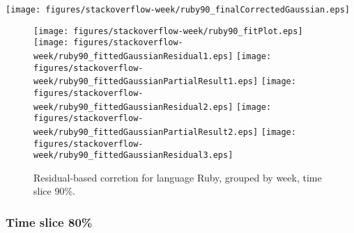 \begin{center}
{\texttt{[image: figures/stackoverflow-week/ruby90\_finalCorrectedGaussian.eps]}}
\end{center}

\FloatBarrier

\begin{figure}[t]
\centering
{}
{\texttt{[image: figures/stackoverflow-week/ruby90\_fitPlot.eps]}}
{\texttt{[image: figures/stackoverflow-week/ruby90\_fittedGaussianResidual1.eps]}}
{\texttt{[image: figures/stackoverflow-week/ruby90\_fittedGaussianPartialResult1.eps]}}
{\texttt{[image: figures/stackoverflow-week/ruby90\_fittedGaussianResidual2.eps]}}
{\texttt{[image: figures/stackoverflow-week/ruby90\_fittedGaussianPartialResult2.eps]}}
{\texttt{[image: figures/stackoverflow-week/ruby90\_fittedGaussianResidual3.eps]}}
\caption{Residual-based corretion for language Ruby, grouped by week, time slice 90\%.}
\end{figure}


\FloatBarrier


\subsubsection{Time slice 80\%}

